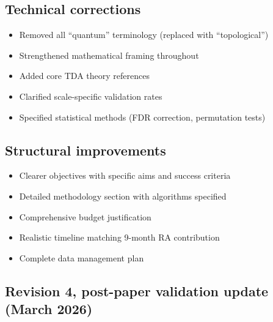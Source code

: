 \subsection{Technical corrections}

\begin{itemize}
  \item Removed all ``quantum'' terminology (replaced with ``topological'')
  \item Strengthened mathematical framing throughout
  \item Added core TDA theory references
  \item Clarified scale-specific validation rates
  \item Specified statistical methods (FDR correction, permutation tests)
\end{itemize}

\subsection{Structural improvements}

\begin{itemize}
  \item Clearer objectives with specific aims and success criteria
  \item Detailed methodology section with algorithms specified
  \item Comprehensive budget justification
  \item Realistic timeline matching 9-month RA contribution
  \item Complete data management plan
\end{itemize}

\subsection{Revision 4, post-paper validation update (March 2026)}

